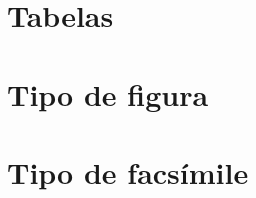 \begin{anexosenv}

\partanexos

\chapter{Tabelas}






\chapter{Tipo de figura}



\chapter{Tipo de facsímile}



\end{anexosenv}